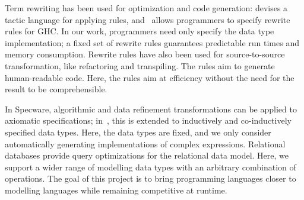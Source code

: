 \documentclass[runningheads]{llncs}
\begin{document}
Term rewriting has been used for optimization and code generation: \cite{elco1998building} devises a tactic language for applying rules, and~\cite{peytonjones2001playing} allows programmers to specify rewrite rules for GHC. In our work, programmers need only specify the data type implementation; a fixed set of rewrite rules guarantees predictable run times and memory consumption.
Rewrite rules have also been used for source-to-source transformation, like refactoring and transpiling. The rules aim to generate human-readable code. Here, the rules aim at efficiency without the need for the result to be comprehensible.

In Specware, algorithmic and data refinement transformations can be applied to axiomatic specifications; in~\cite{SmithWestfold20GeneratingTypeRefinements}, this is extended to inductively and co-inductively specified data types. Here, the data types are fixed, and we only consider automatically generating implementations of complex expressions. Relational databases provide query optimizations for the relational data model. Here, we support a wider range of modelling data types with an arbitrary combination of operations. The goal of this project is to bring programming languages closer to modelling languages while remaining competitive at runtime.


\end{document}
